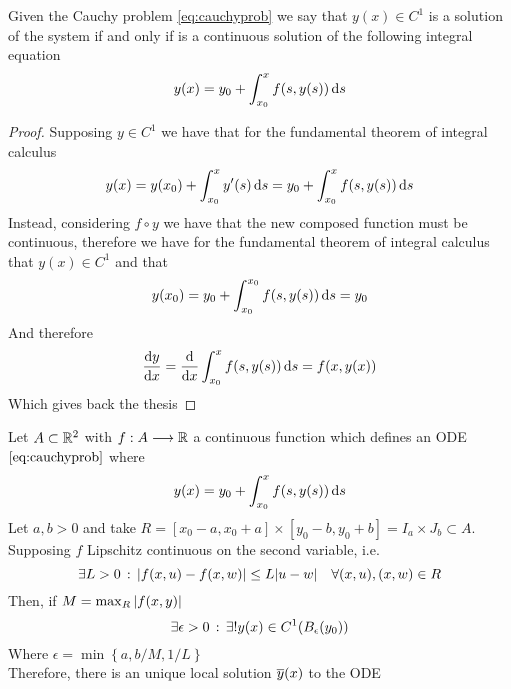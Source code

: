 \documentclass[../complete.tex]{subfiles}
\begin{document}
\begin{thm}
	Given the Cauchy problem \eqref{eq:cauchyprob} we say that $y(x)\in C^1$ is a solution of the system if and only if is a continuous solution of the following integral equation
	\begin{equation}
		y(x)=y_0+\int_{x_0}^{x}f(s,y(s))\operatorname{d\!} s
		\label{eq:cauchyprobsol}
	\end{equation}
\end{thm}
\begin{proof}
	Supposing $y\in C^1$ we have that for the fundamental theorem of integral calculus
	\begin{equation*}
		y(x)=y(x_0)+\int_{x_0}^{x}y'(s)\operatorname{d\!} s=y_0+\int_{x_0}^{x}f(s,y(s))\operatorname{d\!} s
	\end{equation*}
	Instead, considering $f\circ y$ we have that the new composed function must be continuous, therefore we have for the fundamental theorem of integral calculus that $y(x)\in C^1$ and that
	\begin{equation*}
		y(x_0)=y_0+\int_{x_0}^{x_0}f(s,y(s))\operatorname{d\!} s=y_0
	\end{equation*}
	And therefore
	\begin{equation*}
		\derivative{y}{x}=\derivative{x}\int_{x_0}^{x}f(s,y(s))\diff s=f(x,y(x))
	\end{equation*}
	Which gives back the thesis
\end{proof}
\begin{thm}
	Let $A\subset\mathbb{R}^2$ with $f:A\overset{}{\longrightarrow}\mathbb{R}$ a continuous function which defines an ODE $\eqref{eq:cauchyprob}$ where
	\begin{equation*}
		y(x)=y_0+\int_{x_0}^{x}f(s,y(s))\operatorname{d\!} s
	\end{equation*}
	Let $a,b>0$ and take $R=[x_0-a,x_0+a]\times[y_0-b,y_0+b]=I_a\times J_b\subset A$. Supposing $f$ Lipschitz continuous on the second variable, i.e.
	\begin{equation*}
		\exists L>0\, :\, \abs{f(x,u)-f(x,w)}\le L\abs{u-w}\quad \forall (x,u),(x,w)\in R
	\end{equation*}
	Then, if $M=\max_R\abs{f(x,y)}$
	\begin{equation*}
		\exists\epsilon>0\, :\, \exists!y(x)\in C^1(B_\epsilon(y_0))
	\end{equation*}
	Where $\epsilon=\min\left\{ a,b/M,1/L \right\}$\\
	Therefore, there is an unique local solution $\overline{y}(x)$ to the ODE
\end{thm}
\end{document}
